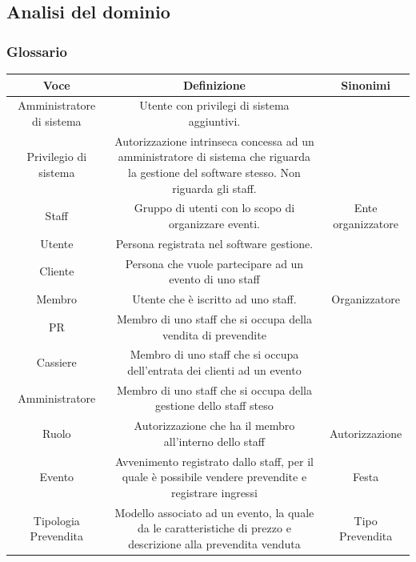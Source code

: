 \documentclass[a4paper]{article}
\begin{document}
\newpage

\subsection{Analisi del dominio}

\subsubsection{Glossario}

\begin{table}[ht!]
  \begin{center}
    \begin{tabulary}{1\textwidth}{|c|C|C|}
        \hline
        \textbf{Voce} & \textbf{Definizione} & \textbf{Sinonimi}\\
        \hline
        \hline
		Amministratore di sistema & Utente con privilegi di sistema aggiuntivi. & \\
		\hline
		Privilegio di sistema & Autorizzazione intrinseca concessa ad un amministratore di sistema che riguarda la gestione del software stesso. Non riguarda gli staff. & \\
		\hline
        Staff & Gruppo di utenti con lo scopo di organizzare eventi. & Ente organizzatore \\
        \hline
        Utente & Persona registrata nel software gestione. & \\
        \hline
		Cliente & Persona che vuole partecipare ad un evento di uno staff & \\
		\hline
        Membro & Utente che è iscritto ad uno staff. & Organizzatore \\
        \hline
		PR & Membro di uno staff che si occupa della vendita di prevendite & \\
		\hline
		Cassiere & Membro di uno staff che si occupa dell'entrata dei clienti ad un evento & \\
		\hline
		Amministratore & Membro di uno staff che si occupa della gestione dello staff steso & \\
		\hline
        Ruolo & Autorizzazione che ha il membro all'interno dello staff & Autorizzazione \\
        \hline
        Evento & Avvenimento registrato dallo staff, per il quale è possibile vendere prevendite e registrare ingressi & Festa \\
        \hline
        Tipologia Prevendita & Modello associato ad un evento, la quale da le caratteristiche di prezzo e descrizione alla prevendita venduta & Tipo Prevendita \\

\end{tabulary}
\end{center}
\end{table}
\end{document}
